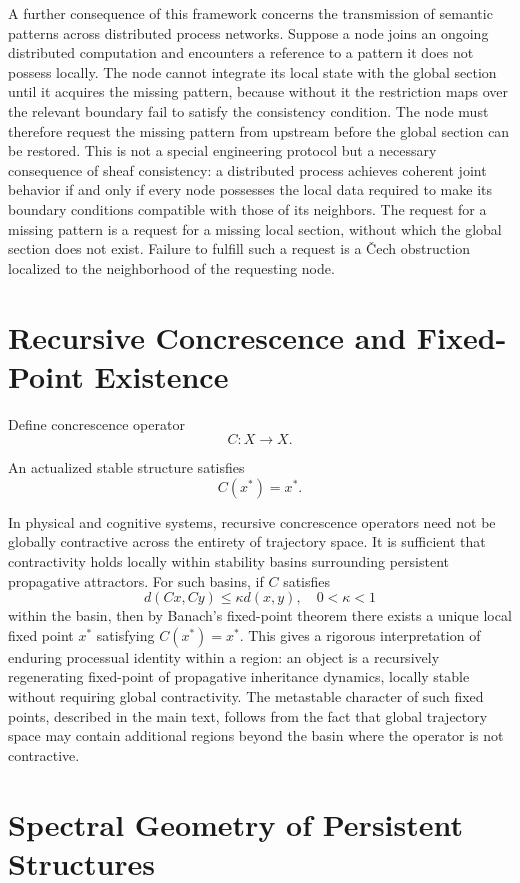 \documentclass[12pt,a4paper]{article}
\begin{document}
A further consequence of this framework concerns the transmission of semantic patterns across distributed process networks. Suppose a node joins an ongoing distributed computation and encounters a reference to a pattern it does not possess locally. The node cannot integrate its local state with the global section until it acquires the missing pattern, because without it the restriction maps over the relevant boundary fail to satisfy the consistency condition. The node must therefore request the missing pattern from upstream before the global section can be restored. This is not a special engineering protocol but a necessary consequence of sheaf consistency: a distributed process achieves coherent joint behavior if and only if every node possesses the local data required to make its boundary conditions compatible with those of its neighbors. The request for a missing pattern is a request for a missing local section, without which the global section does not exist. Failure to fulfill such a request is a Čech obstruction localized to the neighborhood of the requesting node.

\section{Recursive Concrescence and Fixed-Point Existence}

Define concrescence operator
\[
C : X\to X.
\]

An actualized stable structure satisfies
\[
C(x^\ast)=x^\ast.
\]

In physical and cognitive systems, recursive concrescence operators need not be globally contractive across the entirety of trajectory space. It is sufficient that contractivity holds locally within stability basins surrounding persistent propagative attractors. For such basins, if \(C\) satisfies
\[
d(Cx,Cy)
\leq
\kappa d(x,y),
\quad
0<\kappa<1
\]
within the basin, then by Banach's fixed-point theorem there exists a unique local fixed point \(x^\ast\) satisfying \(C(x^\ast)=x^\ast\). This gives a rigorous interpretation of enduring processual identity within a region: an object is a recursively regenerating fixed-point of propagative inheritance dynamics, locally stable without requiring global contractivity. The metastable character of such fixed points, described in the main text, follows from the fact that global trajectory space may contain additional regions beyond the basin where the operator is not contractive.

\section{Spectral Geometry of Persistent Structures}
\end{document}
